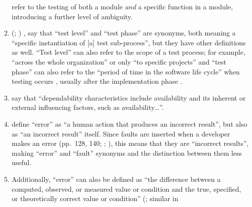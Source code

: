 \begin{enumerate}
          refer to the testing of both a module \emph{and} a specific function
          in a module, introducing a further level of
          ambiguity.
    \item %
          \citeauthor{IEEE2017} \ifnotpaper
              (\citeyear[pp.~469, 470]{IEEE2017}; \citeyear[p.~9]{IEEE2013}) \else
              \cite[pp.~469, 470]{IEEE2017}, \cite[p.~9]{IEEE2013} \fi say that
          ``test level'' and ``test phase'' are synonyms, both meaning a
          ``specific instantiation of [a] test sub-process'', but they have
          other definitions as well. ``Test level'' can also
          refer to the scope of a test process; for example, ``across the whole
          organization'' or only ``to specific projects''
          \citeyearpar[p.~24]{IEEE2022} and ``test phase'' can also refer to
          the ``period of time in the software life cycle'' when testing occurs
          \citeyearpar[p.~470]{IEEE2017}, usually after the implementation phase
          \citep[pp.~420, 509;][p.~56]{Perry2006}.
    \item %
          \citet[p.~375]{IEEE2017} say that ``dependability characteristics
          include availability and its inherent or external influencing
          factors, such as availability\dots''.
    \item %
          \citet[p.~128]{IEEE2010} define
          ``error'' as ``a human action that produces an incorrect result'',
          but also as ``an incorrect result'' itself. Since faults are inserted
          when a developer makes an error %
          (pp.~128, 140; \citealp[p.~12\=/3]{SWEBOK2024};
          \citealp[pp.~399\==400]{vanVliet2000}), this means that they are
          ``incorrect results'', making ``error'' and ``fault'' synonyms%
           and
          the distinction between them less useful.
    \item %
          Additionally, ``error'' can also be defined as ``the
          difference between a computed, observed, or measured value or
          condition and the true, specified, or theoretically correct value
          or condition'' (\citealp[p.~128]{IEEE2010}; similar in

\end{enumerate}
